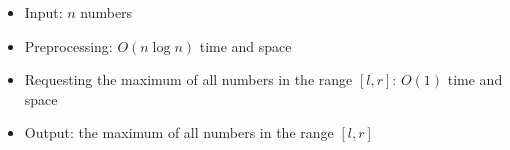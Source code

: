 \begin{itemize}
	\item Input: $n$ numbers
	\item Preprocessing: $O(n\log{n})$ time and space
	\item Requesting the maximum of all numbers in the range $[l, r]$: $O(1)$ time and space
	\item Output: the maximum of all numbers in the range $[l, r]$
\end{itemize}